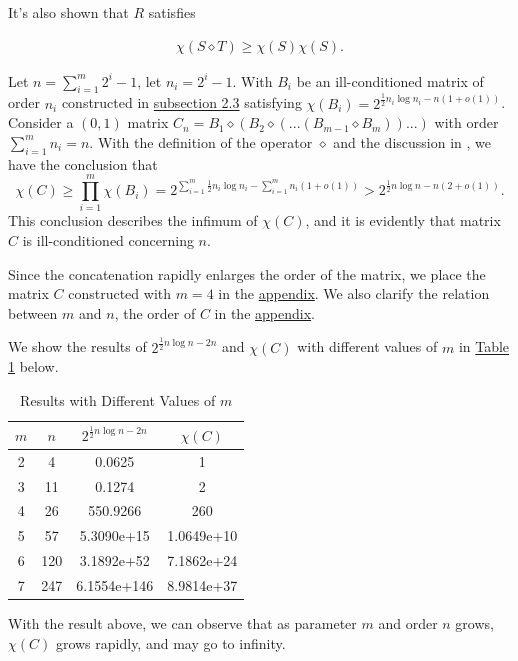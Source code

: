 \documentclass[11pt]{article}
\begin{document}
It's also shown that $R$ satisfies

\begin{align*}
\chi(S \diamond T) \geq \chi(S)\chi(S).
\end{align*}

Let $n = \sum_{i=1}^m 2^{i} - 1$, let $n_i = 2^{i} - 1$. With $B_i$ be an ill-conditioned matrix of order $n_i$ constructed in \hyperref[section2.3]{subsection 2.3} satisfying $\chi(B_i)=2^{\frac{1}{2}n_i\log n_i-n(1+o(1))}$. Consider a $(0, 1)$ matrix $C_n = B_1 \diamond (B_2 \diamond (. . . (B_{m-1} \diamond B_m))...)$ with order $\sum_{i=1}^m n_i =n$. With the definition of the operator $\diamond$ and the discussion in \cite{ALON1997133}, we have the conclusion that
$$\chi(C)\geq \prod_{i=1}^m\chi(B_{i}) = 2^{\sum_{i=1}^m \frac{1}{2}n_i \log n_i - \sum_{i=1}^{m}n_i(1+o(1))} > 2^{\frac{1}{2}n\log n-n(2+o(1))}.$$
This conclusion describes the infimum of $\chi(C)$, and it is evidently that matrix $C$ is ill-conditioned concerning $n$.

Since the concatenation rapidly enlarges the order of the matrix, we place the matrix $C$ constructed with $m = 4$ in the \hyperref[appe:matrix_c]{appendix}. We also clarify the relation between $m$ and $n$, the order of $C$ in the \hyperref[appe:clarifynm]{appendix}. 

We show the results of $2^{\frac{1}{2}n\log n-2n}$ and $\chi(C)$ with different values of $m$ in \hyperref[table:1]{Table 1} below.

\begin{table}[h!]
    \centering
    \begin{tabular}{||c c c c||} 
     \hline
     $m$ & $n$ & $2^{\frac{1}{2}n\log n-2n}$ & $\chi(C)$ \\ [0.5ex] 
     \hline\hline
     2 & 4 & 0.0625 & 1 \\ 
     3 & 11 & 0.1274 & 2 \\
     4 & 26 & 550.9266 & 260 \\
     5 & 57 & 5.3090e+15 & 1.0649e+10 \\ 
     6 & 120 & 3.1892e+52 & 7.1862e+24 \\ 
     7 & 247 & 6.1554e+146 & 8.9814e+37 \\ [1ex]
     \hline
    \end{tabular}
    \caption{Results with Different Values of $m$}
    \label{table:1}
\end{table}

With the result above, we can observe that as parameter $m$ and order $n$ grows, $\chi(C)$ grows rapidly, and may go to infinity.
\end{document}
